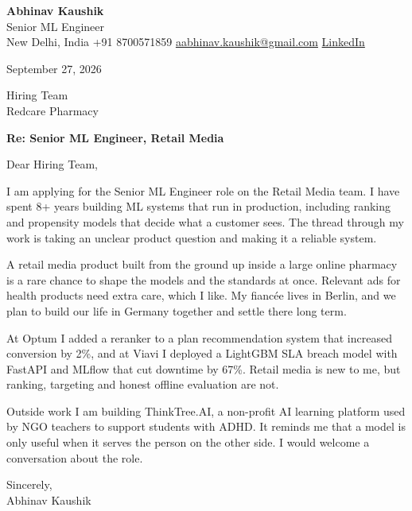 \documentclass[11pt,a4paper]{article}
\begin{document}
{\Large\bfseries Abhinav Kaushik}\\
Senior ML Engineer\\
New Delhi, India \textbar{} +91 8700571859 \textbar{} \href{mailto:aabhinav.kaushik@gmail.com}{aabhinav.kaushik@gmail.com} \textbar{} \href{https://www.linkedin.com/in/abhinav-kaushik10/}{LinkedIn}  

September 27, 2026

Hiring Team\\
Redcare Pharmacy

\textbf{Re: Senior ML Engineer, Retail Media}

Dear Hiring Team,

I am applying for the Senior ML Engineer role on the Retail Media team. I have spent 8+ years building ML systems that run in production, including ranking and propensity models that decide what a customer sees. The thread through my work is taking an unclear product question and making it a reliable system.

A retail media product built from the ground up inside a large online pharmacy is a rare chance to shape the models and the standards at once. Relevant ads for health products need extra care, which I like. My fiancée lives in Berlin, and we plan to build our life in Germany together and settle there long term.

At Optum I added a reranker to a plan recommendation system that increased conversion by 2\%, and at Viavi I deployed a LightGBM SLA breach model with FastAPI and MLflow that cut downtime by 67\%. Retail media is new to me, but ranking, targeting and honest offline evaluation are not.

Outside work I am building ThinkTree.AI, a non-profit AI learning platform used by NGO teachers to support students with ADHD. It reminds me that a model is only useful when it serves the person on the other side. I would welcome a conversation about the role.

Sincerely,\\[4pt]
Abhinav Kaushik
\end{document}
